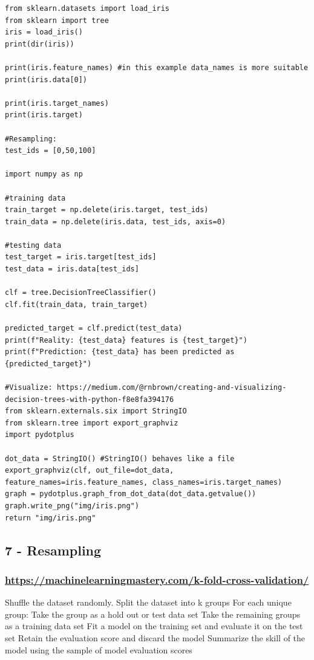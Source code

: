 \documentclass[11pt]{article}
\begin{document}
\begin{verbatim}
from sklearn.datasets import load_iris
from sklearn import tree
iris = load_iris()
print(dir(iris))

print(iris.feature_names) #in this example data_names is more suitable
print(iris.data[0])

print(iris.target_names)
print(iris.target)

#Resampling:
test_ids = [0,50,100]

import numpy as np

#training data
train_target = np.delete(iris.target, test_ids)
train_data = np.delete(iris.data, test_ids, axis=0)

#testing data
test_target = iris.target[test_ids]
test_data = iris.data[test_ids]

clf = tree.DecisionTreeClassifier()
clf.fit(train_data, train_target)

predicted_target = clf.predict(test_data)
print(f"Reality: {test_data} features is {test_target}")
print(f"Prediction: {test_data} has been predicted as {predicted_target}")

#Visualize: https://medium.com/@rnbrown/creating-and-visualizing-decision-trees-with-python-f8e8fa394176
from sklearn.externals.six import StringIO  
from sklearn.tree import export_graphviz
import pydotplus

dot_data = StringIO() #StringIO() behaves like a file
export_graphviz(clf, out_file=dot_data, feature_names=iris.feature_names, class_names=iris.target_names)
graph = pydotplus.graph_from_dot_data(dot_data.getvalue())  
graph.write_png("img/iris.png")
return "img/iris.png"
\end{verbatim}




\subsection{7 - Resampling}
\label{sec:org1b43e76}

\subsubsection{\url{https://machinelearningmastery.com/k-fold-cross-validation/}}
\label{sec:org517502d}
Shuffle the dataset randomly.
Split the dataset into k groups
For each unique group:
Take the group as a hold out or test data set
Take the remaining groups as a training data set
Fit a model on the training set and evaluate it on the test set
Retain the evaluation score and discard the model
Summarize the skill of the model using the sample of model evaluation scores
\end{document}
